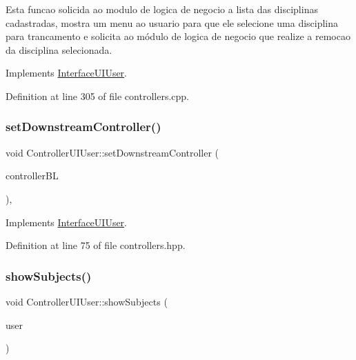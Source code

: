 Esta funcao solicida ao modulo de logica de negocio a lista das disciplinas cadastradas, mostra um menu ao usuario para que ele selecione uma disciplina para trancamento e solicita ao módulo de logica de negocio que realize a remocao da disciplina selecionada. 

Implements \hyperlink{class_interface_u_i_user_a2f1348af12103048245fcf31e9677994}{Interface\+U\+I\+User}.



Definition at line 305 of file controllers.\+cpp.

\mbox{\label{class_controller_u_i_user_ad4ad2668cd963c5fa733bb8988268d99}} 
\subsubsection{\texorpdfstring{set\+Downstream\+Controller()}{setDownstreamController()}}
{\footnotesize\ttfamily void Controller\+U\+I\+User\+::set\+Downstream\+Controller (\begin{DoxyParamCaption}\item[{\hyperlink{class_interface_b_l_user}{Interface\+B\+L\+User} $\ast$}]{controller\+BL }\end{DoxyParamCaption})\hspace{0.3cm}{\ttfamily [inline]}, {\ttfamily [virtual]}}



Implements \hyperlink{class_interface_u_i_user_a304a797f05d78a08f3ed2116c7a0028a}{Interface\+U\+I\+User}.



Definition at line 75 of file controllers.\+hpp.

\mbox{\label{class_controller_u_i_user_a98a0e51ff5b82264bdda2683e5b19e36}} 
\subsubsection{\texorpdfstring{show\+Subjects()}{showSubjects()}}
{\footnotesize\ttfamily void Controller\+U\+I\+User\+::show\+Subjects (\begin{DoxyParamCaption}\item[{\hyperlink{class_user}{User} $\ast$}]{user }\end{DoxyParamCaption})\hspace{0.3cm}{\ttfamily [virtual]}}



